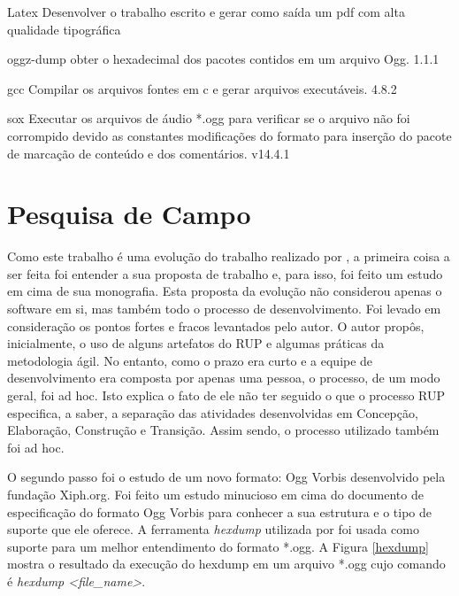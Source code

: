 Latex Desenvolver o trabalho escrito e gerar como saída um pdf com alta qualidade tipográfica		

oggz-dump obter o hexadecimal dos pacotes contidos em um arquivo Ogg.  1.1.1

gcc Compilar os arquivos fontes em c e gerar arquivos executáveis. 4.8.2 

sox Executar os arquivos de áudio *.ogg para verificar se o arquivo não foi corrompido devido as constantes modificações do formato para inserção do pacote de marcação de conteúdo e dos comentários. v14.4.1 

\section{Pesquisa de Campo}

Como este trabalho é uma evolução do trabalho realizado por \cite{herbert}, a primeira coisa a ser feita foi entender a sua proposta de trabalho e, para isso, foi feito um estudo em cima de sua monografia. Esta proposta da evolução não considerou apenas o software em si, mas também todo o processo de desenvolvimento. Foi levado em consideração os pontos fortes e fracos levantados pelo autor. O autor propôs, inicialmente, o uso de alguns artefatos do RUP e algumas práticas da metodologia ágil. No entanto, como o prazo era curto e a equipe de desenvolvimento era composta por apenas uma pessoa, o processo, de um modo geral, foi ad hoc. Isto explica o fato de ele não ter seguido o que o processo RUP especifica, a saber, a separação das atividades desenvolvidas em Concepção, Elaboração, Construção e Transição. Assim sendo, o processo utilizado também foi ad hoc.

O segundo passo foi o estudo de um novo formato: Ogg Vorbis desenvolvido pela fundação Xiph.org. Foi feito um estudo minucioso em cima do documento de especificação do formato Ogg Vorbis para conhecer a sua estrutura e o tipo de suporte que ele oferece. A ferramenta \textit{hexdump} utilizada por \cite{herbert} foi usada como suporte para um melhor entendimento do formato *.ogg. A Figura \ref{hexdump} mostra o resultado da execução do hexdump em um arquivo *.ogg cujo comando é \textit{hexdump <file\_name>}.

